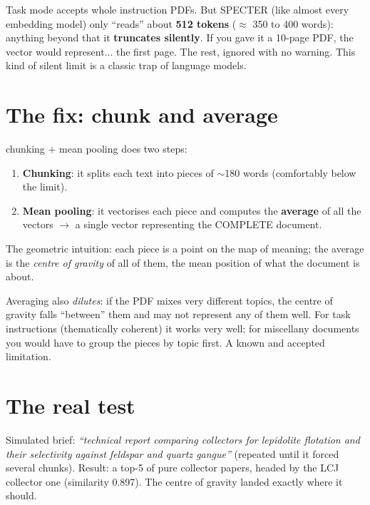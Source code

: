 \documentclass[11pt,a4paper]{article}
\begin{document}
Task mode accepts whole instruction PDFs. But SPECTER (like almost every embedding model) only
``reads'' about \textbf{512 tokens} ($\approx$ 350 to 400 words): anything beyond that it
\textbf{truncates silently}. If you gave it a 10-page PDF, the vector would represent... the
first page. The rest, ignored with no warning. This kind of silent limit is a classic trap of
language models.

\section{The fix: chunk and average}

\begin{concepto}{chunking $+$ mean pooling}
 does two steps:
\begin{enumerate}
  \item \textbf{Chunking}: it splits each text into pieces of $\sim$180 words (comfortably
        below the limit).
  \item \textbf{Mean pooling}: it vectorises each piece and computes the \textbf{average} of
        all the vectors $\rightarrow$ a single vector representing the COMPLETE document.
\end{enumerate}
The geometric intuition: each piece is a point on the map of meaning; the average is the
\emph{centre of gravity} of all of them, the mean position of what the document is about.
\end{concepto}

\begin{ojo}
Averaging also \emph{dilutes}: if the PDF mixes very different topics, the centre of gravity
falls ``between'' them and may not represent any of them well. For task instructions
(thematically coherent) it works very well; for miscellany documents you would have to group
the pieces by topic first. A known and accepted limitation.
\end{ojo}

\section{The real test}

Simulated brief: \emph{``technical report comparing collectors for lepidolite flotation and
their selectivity against feldspar and quartz gangue''} (repeated until it forced several
chunks). Result: a top-5 of pure collector papers, headed by the LCJ collector one (similarity
0.897). The centre of gravity landed exactly where it should.
\end{document}
